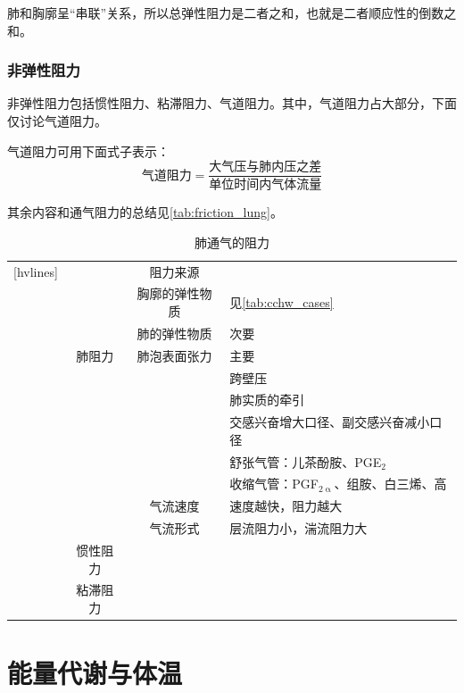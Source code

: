 肺和胸廓呈“串联”关系，所以总弹性阻力是二者之和，也就是二者顺应性的倒数之和。

\subsubsection{非弹性阻力}

非弹性阻力包括惯性阻力、粘滞阻力、气道阻力。其中，气道阻力占大部分，下面仅讨论气道阻力。

气道阻力可用下面式子表示：\[\text{气道阻力}=\frac{\text{大气压与肺内压之差}}{\text{单位时间内气体流量}}\]

其余内容和通气阻力的总结见\autoref{tab:friction_lung}。

\begin{table}[htbp]
	\centering
	\begin{NiceTabularX}{\textwidth}{cccX}[hvlines]
		 &  & 阻力来源 & \\
		 &  & 胸廓的弹性物质 & 见\autoref{tab:cchw_cases}\\
		&  & 肺的弹性物质 & 次要 \\
		& 肺阻力 & 肺泡表面张力 & 主要 \\
		 &  &  & 跨壁压\\
		&  &  & 肺实质的牵引 \\
		&  &  & 交感兴奋增大口径、副交感兴奋减小口径 \\
		&  &  & 舒张气管：儿茶酚胺、PGE$_2$ \\
		&  &  & 收缩气管：PGF$_{2\upalpha}$、组胺、白三烯、高 \\
		&  & 气流速度 & 速度越快，阻力越大\\
		&  & 气流形式 & 层流阻力小，湍流阻力大\\
		& 惯性阻力 &  & \\
		& 粘滞阻力 &  &
	\end{NiceTabularX}
	\caption{肺通气的阻力}
	\label{tab:friction_lung}
\end{table}








\section{能量代谢与体温}

